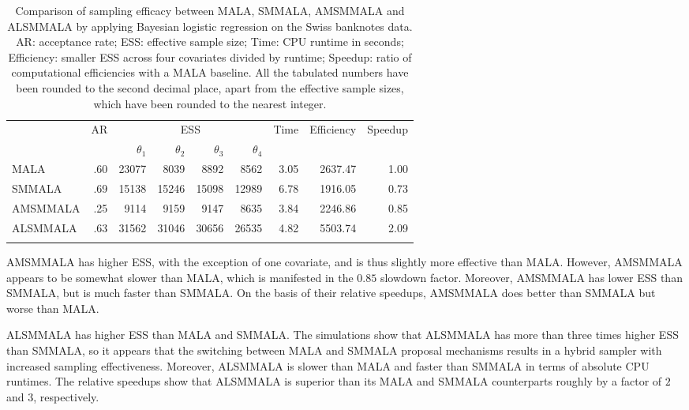 \documentclass[twoside,11pt]{article}
\begin{document}
\begin{table}[t]
	\centering
	\begin{tabular}{l|r|rrrr|r|r|r}
		\hline\noalign{\smallskip}
		\multirow{2}{*}{Method} &
		\multirow{2}{*}{AR} &
		\multicolumn{4}{c|}{ESS} &
		\multirow{2}{*}{Time} &
		\multirow{2}{*}{Efficiency} &
		\multirow{2}{*}{Speedup} \\
		& & $\theta_1$ & $\theta_2$ & $\theta_3$ & $\theta_4$ & & & \\
		\noalign{\smallskip}\hline\noalign{\smallskip}
		MALA & .60 & 23077 & 8039 & 8892 & 8562 & 3.05 & 2637.47 & 1.00 \\
		SMMALA & .69 & 15138 & 15246 & 15098 & 12989 & 6.78 & 1916.05 & 0.73 \\
		AMSMMALA & .25 & 9114 & 9159 & 9147 & 8635 & 3.84 & 2246.86 & 0.85 \\
	  ALSMMALA & .63 & 31562 & 31046 & 30656 & 26535 & 4.82 & 5503.74 & 2.09 \\
		\noalign{\smallskip}\hline
	\end{tabular}
	\caption{
		Comparison of sampling efficacy between MALA, SMMALA, AMSMMALA and ALSMMALA by applying Bayesian logistic regression on
		the Swiss banknotes data. AR: acceptance rate; ESS: effective sample size; Time: CPU runtime in seconds; Efficiency:
		smaller ESS across four covariates divided by runtime; Speedup: ratio of computational efficiencies with a MALA baseline.
	  All the tabulated numbers have been rounded to the second decimal place, apart from the effective sample sizes, which 
	  have been rounded to the nearest integer.
	}
	\label{tab:logit}
\end{table}

AMSMMALA has higher ESS, with the exception of one covariate, and is thus slightly more effective than MALA. However, 
AMSMMALA appears to be somewhat slower than MALA, which is manifested in the $0.85$ slowdown factor. Moreover, AMSMMALA has
lower ESS than SMMALA, but is much faster than SMMALA. On the basis of their relative speedups, AMSMMALA does better than
SMMALA but worse than MALA.

ALSMMALA has higher ESS than MALA and SMMALA. The simulations show that ALSMMALA has more than three times higher ESS than
SMMALA, so it appears that the switching between MALA and SMMALA proposal mechanisms results in a hybrid sampler with 
increased sampling effectiveness. Moreover, ALSMMALA is slower than MALA and faster than SMMALA in terms of absolute CPU
runtimes. The relative speedups show that ALSMMALA is superior than its MALA and SMMALA counterparts roughly by a factor of
$2$ and $3$, respectively.
\end{document}
